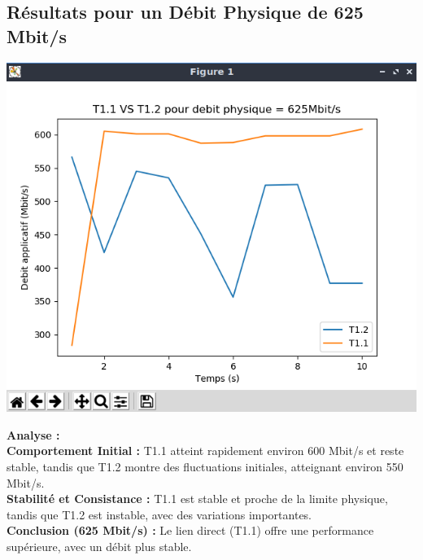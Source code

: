 \subsection{Résultats pour un Débit Physique de 625 Mbit/s}
\begin{center}
    \includegraphics[width=1\textwidth]{./images/T1vsT2pour625.png}
\end{center}
\textbf{Analyse :}\\
\textbf{Comportement Initial :} T1.1 atteint rapidement environ 600 Mbit/s et reste stable, tandis que T1.2 montre des fluctuations initiales, atteignant environ 550 Mbit/s.\\
\textbf{Stabilité et Consistance :} T1.1 est stable et proche de la limite physique, tandis que T1.2 est instable, avec des variations importantes.\\
\textbf{Conclusion (625 Mbit/s) :} Le lien direct (T1.1) offre une performance supérieure, avec un débit plus stable.

